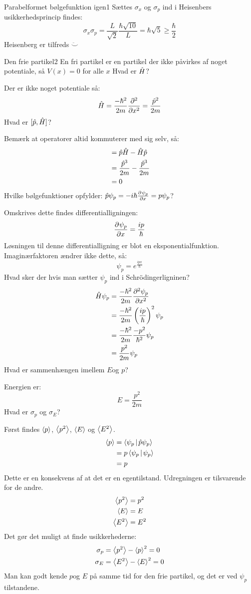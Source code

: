 \begin{opgave}{Parabelformet bølgefunktion igen}{1}
Sættes $\sigma_x$ og $\sigma_p$ ind i Heisenbers usikkerhedsprincip findes:
$$
\sigma_x\sigma_p = \frac{L}{\sqrt{2}}\frac{\hbar\sqrt{10}}{L}= \hbar\sqrt{5}\geq\frac{\hbar}{2}
$$
Heisenberg er tilfreds $\ddot \smile$
\end{opgave}

\begin{opgave}{Den frie partikel}{2}
En fri partikel er en partikel der ikke påvirkes af noget potentiale, så $V(x)=0$ for alle $x$
\opg Hvad er $\op H$?

Der er ikke noget potentiale så:
$$
\op H = \frac{-\hbar^2}{2m}\pdif[2]{x}{} = \frac{\op p^2}{2m}
$$
\opg Hvad er $[\op p,\op H]$?

Bemærk at operatorer altid kommuterer med sig selv, så:
\begin{align*}
    [\op p,\op H]&= \op p\op H-\op H\op p\\
    &= \frac{\op p^3}{2m}-\frac{\op p^3}{2m}\\
    &= 0
\end{align*}
\opg Hvilke bølgefunktioner opfylder: $\op p \psi_p = -i\hbar\pdif{x}{\psi_p} = p\psi_p$?

Omskrives dette findes differentialligningen:
$$
\pdif{x}{\psi_p}=\frac{ip}{\hbar}
$$
Løsningen til denne differentialligning er blot en eksponentialfunktion. Imaginærfaktoren ændrer ikke dette, så:
$$
\psi_p = e^{\frac{ipx}{\hbar}}
$$
\opg Hvad sker der hvis man sætter $\psi_p$ ind i Schrödingerligninen?
\begin{align*}
    \op H\psi_p &= \frac{-\hbar^2}{2m}\pdif[2]{x}{\psi_p}\\
    &= \frac{-\hbar^2}{2m}\left(\frac{ip}{\hbar}\right)^2\psi_p\\
    &= \frac{-\hbar^2}{2m}\frac{-p^2}{\hbar^2}\psi_p\\
    &=\frac{p^2}{2m}\psi_p
\end{align*}
\opg Hvad er sammenhængen imellem $E$og $p$?

Energien er:
$$
E=\frac{p^2}{2m}
$$
\opg Hvad er $\sigma_p$ og $\sigma_E$?

Først findes $\expect{p}$, $\expect{p^2}$, $\expect{E}$ og $\expect{E^2}$.
\begin{align*}
    \expect{p} &= \braket{\psi_p}{\op p\psi_p}\\
    &= p\braket{\psi_p}{\psi_p}\\
    &=p
\end{align*}
Dette er en konsekvens af at det er en egentilstand. Udregningen er tilsvarende for de andre.
\begin{align*}
    \expect{p^2} &= p^2\\
    \expect{E} &= E\\
    \expect{E^2} &= E^2
\end{align*}
Det gør det muligt at finde usikkerhederne:
\begin{align*}
    \sigma_p &= \expect{p^2}-\expect p^2 = 0\\
    \sigma_E &= \expect{E^2}-\expect E^2 = 0
\end{align*}
Man kan godt kende $p$og $E$ på samme tid for den frie partikel, og det er ved $\psi_p$ tilstandene.
\end{opgave}